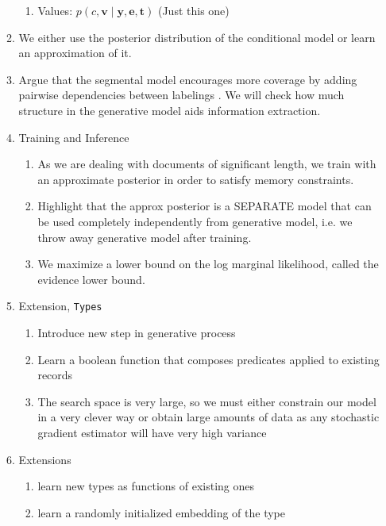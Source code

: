 \documentclass[11pt]{article}
\newcommand{\be}{\mathbf{e}}
\newcommand{\br}{\mathbf{r}}
\newcommand{\bt}{\mathbf{t}}
\newcommand{\bv}{\mathbf{v}}
\newcommand{\by}{\mathbf{y}}
\begin{document}
\begin{enumerate}
\begin{enumerate}
        \begin{enumerate}
        \item Values: $p(c,\bv\mid\by,\be,\bt)$ (Just this one)
        \end{enumerate}
    \item We either use the posterior distribution of the conditional model
        or learn an approximation of it.
    \item Argue that the segmental model encourages more coverage
        by adding pairwise dependencies between labelings \citep{liang2009semalign}.
        We will check how much structure in the generative model
        aids information extraction.
    \item Training and Inference
        \begin{enumerate}
        \item As we are dealing with documents of significant length,
            we train with an approximate posterior in order to satisfy memory constraints.
        \item Highlight that the approx posterior is a SEPARATE model
            that can be used completely independently from generative model,
            i.e. we throw away generative model after training.
        \item We maximize a lower bound on the log marginal likelihood,
            called the evidence lower bound.
        \end{enumerate}
    \item Extension, \texttt{Types}
        \begin{enumerate}
        \item Introduce new step in generative process
        \item Learn a boolean function that composes predicates applied to existing
            records
        \item The search space is very large, so we must either constrain our model 
            in a very clever way or obtain 
            large amounts of data as any stochastic gradient estimator will have very high variance
        \end{enumerate}
    \item Extensions
        \begin{enumerate}
        \item learn new types as functions of existing ones
        \item learn a randomly initialized embedding of the type

\end{enumerate}
\end{enumerate}
\end{enumerate}
\end{document}
